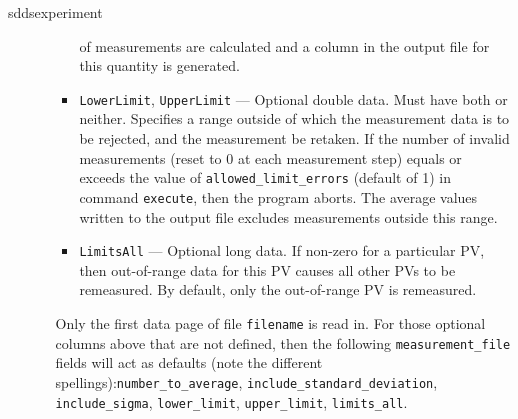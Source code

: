 \begin{sddsprog}{sddsexperiment}
\begin{itemize}
\begin{itemize}
\begin{itemize}
                of measurements are calculated and a column in the output file for this quantity
                is generated.
                \item {\verb+LowerLimit+}, {\verb+UpperLimit+} --- Optional double data. Must have
                both or neither. Specifies a range outside of which the measurement
                data is to be rejected, and the measurement be retaken.
                If the number of invalid measurements (reset to 0 at each
                measurement step) equals or exceeds the value
                of {\verb+allowed_limit_errors+} (default of 1) in command {\verb+execute+}, 
                then the program aborts.
                The average values written to the output file excludes measurements outside this range.
                \item {\verb+LimitsAll+} --- Optional long data. If non-zero for a particular PV, then 
                out-of-range data for this PV causes all other PVs to be remeasured. 
                By default, only the out-of-range PV is remeasured.
        \end{itemize}
                Only the first data page of file {\verb+filename+} is read in. For those
                optional columns above that are not defined, then the following {\verb+measurement_file+} fields
                will act as defaults (note the different spellings):{\verb+number_to_average+}, 
                {\verb+include_standard_deviation+}, {\verb+include_sigma+}, 
                {\verb+lower_limit+}, {\verb+upper_limit+}, {\verb+limits_all+}.
\end{itemize}



\end{itemize}
\end{sddsprog}
